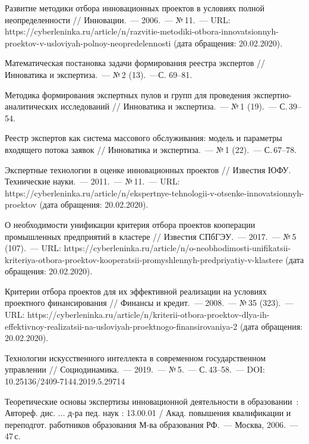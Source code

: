 \begin{thebibliography}{99}
\bibitem{} Развитие методики отбора инновационных проектов в условиях полной неопределенности // Инновации.~--- 2006.~--- №\,11.~--- URL: https://cyberleninka.ru/article/n/razvitie-metodiki-otbora-innovatsionnyh-proektov-v-usloviyah-polnoy-neopredelennosti (дата обращения: 20.02.2020).

\bibitem{} Математическая постановка задачи формирования реестра экспертов // Инноватика и экспертиза.~--- №\,2 (13).~---С. 69--81.

\bibitem{} Методика формирования экспертных пулов и групп для проведения экспертно-аналитических исследований // Инноватика и экспертиза.~--- №\,1 (19).~--- С.\,39--54.

\bibitem{} Реестр экспертов как система массового обслуживания: модель и параметры входящего потока заявок // Инноватика и экспертиза.~--- №\,1 (22).~--- С.\,67--78.

\bibitem{} Экспертные технологии в оценке инновационных проектов // Известия ЮФУ. Технические науки.~--- 2011.~--- №\,11.~--- URL: https://cyberleninka.ru/article/n/ekspertnye-tehnologii-v-otsenke-innovatsionnyh-proektov (дата обращения: 20.02.2020).

\bibitem{} О необходимости унификации критерия отбора проектов кооперации промышленных предприятий в кластере // Известия СПбГЭУ.~--- 2017.~--- №\,5 (107).~--- URL: https://cyberleninka.ru/article/n/o-neobhodimosti-unifikatsii-kriteriya-otbora-proektov-kooperatsii-promyshlennyh-predpriyatiy-v-klastere (дата обращения: 20.02.2020).

\bibitem{} Критерии отбора проектов для их эффективной реализации на условиях проектного финансирования // Финансы и кредит.~--- 2008.~--- №\,35 (323).~--- URL: https://cyberleninka.ru/article/n/kriterii-otbora-proektov-dlya-ih-effektivnoy-realizatsii-na-usloviyah-proektnogo-finansirovaniya-2 (дата обращения: 20.02.2020).

\bibitem{} Технологии искусственного интеллекта в современном государственном управлении // Социодинамика.~--- 2019.~--- №\,5.~--- С.\,43--58.~--- DOI: 10.25136/2409-7144.2019.5.29714

\bibitem{} Теоретические основы экспертизы инновационной деятельности в образовании~: Автореф. дис. $\dots$ д-ра пед. наук : 13.00.01 / Акад. повышения квалификации и переподгот. работников образования М-ва образования РФ.~--- Москва, 2006.~--- 47\,с.


\end{thebibliography}
